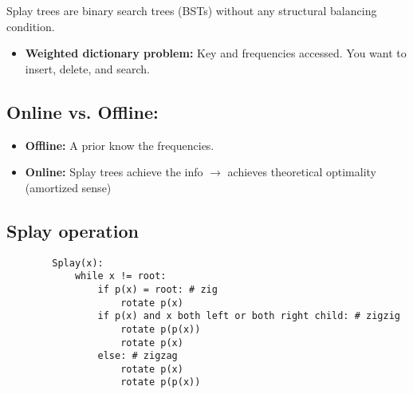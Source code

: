 \begin{definition}
    Splay trees are binary search trees (BSTs) without any structural balancing condition. 
    \begin{itemize}
        \item \textbf{Weighted dictionary problem:} Key and frequencies accessed. You want to insert, delete, and search.
    \end{itemize}
\end{definition}

\subsection{Online vs. Offline:}
\begin{definition}
    \begin{itemize}
        \item \textbf{Offline:} A prior know the frequencies.
        \item \textbf{Online:} Splay trees achieve the info $\rightarrow$ achieves theoretical optimality (amortized sense) 
    \end{itemize}
\end{definition}


\subsection{Splay operation}
\begin{definition}
    \begin{lstlisting}
        Splay(x):
            while x != root:
                if p(x) = root: # zig
                    rotate p(x)
                if p(x) and x both left or both right child: # zigzig
                    rotate p(p(x))
                    rotate p(x)
                else: # zigzag
                    rotate p(x)
                    rotate p(p(x))
    \end{lstlisting}
\end{definition}

